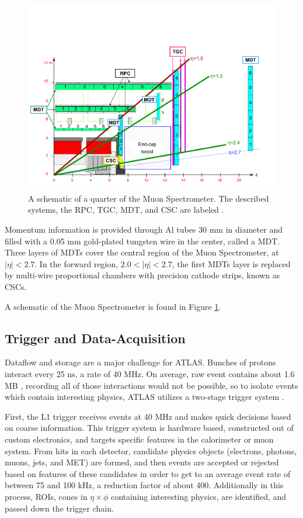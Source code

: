 \begin{figure}[!ht]
    \centering
    \includegraphics[width=.9\textwidth]{chapters/chapter2_experiment/images/muon_detector.png}
    \caption{A schematic of a quarter of the Muon Spectrometer. The described systems, the \gls{RPC}, \gls{TGC}, \gls{MDT}, and \gls{CSC} are labeled \cite{muon-performance2015}.}
    \label{fig:muon-schematic}
\end{figure}


Momentum information is provided through Al tubes 30 mm in diameter and filled with a 0.05 mm gold-plated tungsten wire in the center, called a \gls{MDT}. Three layers of \glspl{MDT} cover the central region of the Muon Spectrometer, at $|\eta| < 2.7$. In the forward region, $2.0<|\eta|<2.7$, the first \glspl{MDT} layer is replaced by multi-wire proportional chambers with precision cathode strips, known as \glspl{CSC}.

A schematic of the Muon Spectrometer is found in Figure \ref{fig:muon-schematic}.

\subsection{Trigger and Data-Acquisition} \label{ssec:tdaq}

Dataflow and storage are a major challenge for ATLAS. Bunches of protons interact every 25 ns, a rate of 40 MHz. On average, raw event contains about 1.6 MB \cite{ATLASfact-sheet}, recording all of those interactions would not be possible, so to isolate events which contain interesting physics, ATLAS utilizes a two-stage trigger system \cite{trigger2010}.

First, the \gls{L1} trigger receives events at 40 MHz and makes quick decisions based on coarse information. This trigger system is hardware based, constructed out of custom electronics, and targets specific features in the calorimeter or muon system. From hits in each detector, candidate physics objects (electrons, photons, muons, jets, and \gls{MET}) are formed, and then events are accepted or rejected based on features of these candidates in order to get to an average event rate of between 75 and 100 kHz, a reduction factor of about 400. Additionally in this process, \glspl{ROI}, cones in $\eta \times \phi$ containing interesting physics, are identified, and passed down the trigger chain.

